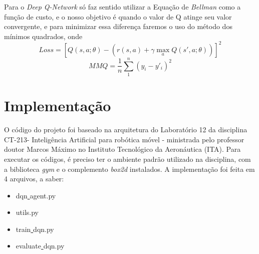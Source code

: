 \documentclass[letterpaper, 10 pt, conference]{ieeeconf}  %
\begin{document}
Para o \emph{Deep Q-Network} só faz sentido utilizar a Equação de \emph{Bellman} como a função de custo, e o nosso objetivo é quando o valor de Q atinge seu valor convergente, e para minimizar essa diferença faremos o uso do método dos mínimos quadrados, onde
$$Loss=[Q(s,a;\theta)-(r(s,a)+\gamma\max_a Q(s',a;\theta))]^2$$
$$MMQ = \frac{1}{n}\sum_1^n (y_i-y'_i)^2$$

\section{Implementação}

O código do projeto foi baseado na arquitetura do Laboratório 12 da disciplina CT-213- Inteligência Artificial para robótica móvel - ministrada pelo professor doutor Marcos Máximo no Instituto Tecnológico da Aeronáutica (ITA). Para executar os códigos, é preciso ter o ambiente padrão utilizado na disciplina, com a biblioteca \emph{gym} e o complemento \emph{box2d} instalados. A implementação foi feita em 4 arquivos, a saber:
\begin{itemize}
   \item dqn\underline{ }agent.py 
   \item utils.py 
   \item train\underline{ }dqn.py 
   \item evaluate\underline{ }dqn.py 
 \end{itemize}
\end{document}
